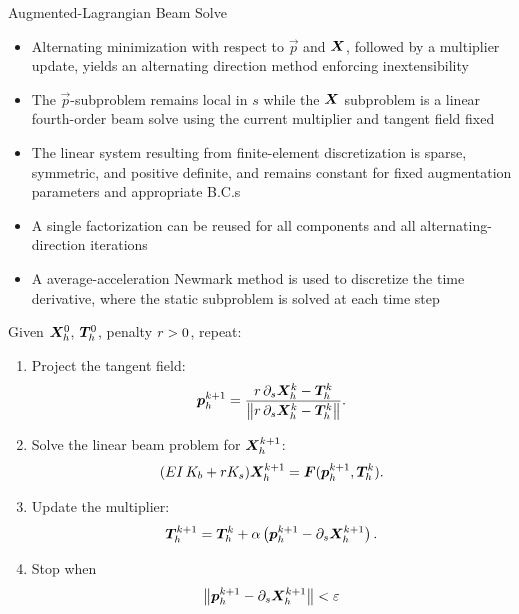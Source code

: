 \documentclass[10pt,english]{beamer}
\begin{document}
\begin{frame}{Augmented-Lagrangian Beam Solve}
    \begin{itemize}
        \item Alternating minimization with respect to \(\vec p\) and
              \(\bm{X}\), followed by a multiplier update, yields an
              alternating direction method enforcing inextensibility
        \item The \(\vec p\)-subproblem remains local in \(s\) while the
              \(\bm{X}\) subproblem is a linear fourth-order beam solve using
              the current multiplier and tangent field fixed
        \item The linear system resulting from finite-element discretization is
              sparse, symmetric, and positive definite, and remains constant
              for fixed augmentation parameters and appropriate B.C.s
        \item A single factorization can be reused for all components and all
              alternating-direction iterations
        \item A average-acceleration Newmark method is used to discretize the
              time derivative, where the static subproblem is solved at each
              time step
    \end{itemize}
\end{frame}

\begin{frame}
    Given \(\bm{X}_h^0\), \(\bm{T}_h^0\), penalty \(r>0\), repeat:
    \begin{enumerate}
        \item Project the tangent field:
              \[
                  \bm{p}_h^{k+1}
                  =
                  \frac{
                      r\,\partial_s \bm{X}_h^k - \bm{T}_h^k
                  }{
                      \left\lVert r\,\partial_s \bm{X}_h^k - \bm{T}_h^k\right\rVert
                  }.
              \]

        \item Solve the linear beam problem for \(\bm{X}_h^{k+1}\):
              \[
                  (EI\,K_b+r K_s)\bm{X}_h^{k+1}
                  =
                  \bm{F}(\bm{p}_h^{k+1},\bm{T}_h^k).
              \]

        \item Update the multiplier:
              \[
                  \bm{T}_h^{k+1}
                  =
                  \bm{T}_h^k
                  +
                  \alpha
                  \left(
                  \bm{p}_h^{k+1}
                  -
                  \partial_s\bm{X}_h^{k+1}
                  \right).
              \]

        \item Stop when
              \[
                  \left\lVert\bm{p}_h^{k+1}-\partial_s\bm{X}_h^{k+1}\right\rVert < \varepsilon
              \]
    \end{enumerate}
\end{frame}
\end{document}
